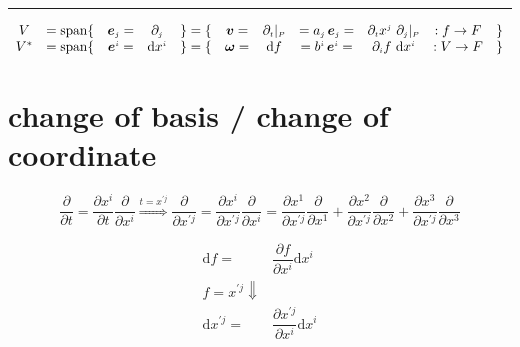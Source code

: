 \documentclass[
]{book}
\theoremstyle{definition}
\theoremstyle{definition}
\theoremstyle{definition}
\theoremstyle{definition}
\theoremstyle{remark}
\begin{document}
\begin{center}\rule{0.5\linewidth}{0.5pt}\end{center}

\[
\begin{array}{ccccccccccc}
V & =\mathrm{span}\{ & \boldsymbol{e}_{{\scriptscriptstyle j}}= & \partial_{{\scriptscriptstyle j}} & \}=\{ & \boldsymbol{v}= & \partial_{{\scriptscriptstyle t}}|_{{\scriptscriptstyle P}} & =a_{{\scriptscriptstyle j}}\thinspace\boldsymbol{e}_{{\scriptscriptstyle j}}= & \partial_{{\scriptscriptstyle t}}x^{{\scriptscriptstyle j}}\ \partial_{{\scriptscriptstyle j}}|_{{\scriptscriptstyle P}} & :f\rightarrow F & \}\\
V^{*} & =\mathrm{span}\{ & \boldsymbol{e}^{{\scriptscriptstyle i}}= & \mathrm{d}x^{{\scriptscriptstyle i}} & \}=\{ & \boldsymbol{\omega}= & \mathrm{d}f & =b^{{\scriptscriptstyle i}}\thinspace\boldsymbol{e}^{{\scriptscriptstyle i}}= & \partial_{{\scriptscriptstyle i}}f\ \mathrm{d}x^{{\scriptscriptstyle i}} & :V\rightarrow F & \}
\end{array}
\]

\section{change of basis / change of coordinate}\label{change-of-basis-change-of-coordinate}

\[
\dfrac{\partial}{\partial t}=\dfrac{\partial x^{{\scriptscriptstyle i}}}{\partial t}\dfrac{\partial}{\partial x^{{\scriptscriptstyle i}}}\overset{t=x^{\prime{\scriptscriptstyle j}}}{\Rightarrow}\dfrac{\partial}{\partial x^{\prime{\scriptscriptstyle j}}}=\dfrac{\partial x^{{\scriptscriptstyle i}}}{\partial x^{\prime{\scriptscriptstyle j}}}\dfrac{\partial}{\partial x^{{\scriptscriptstyle i}}}=\dfrac{\partial x^{{\scriptscriptstyle 1}}}{\partial x^{\prime{\scriptscriptstyle j}}}\dfrac{\partial}{\partial x^{{\scriptscriptstyle 1}}}+\dfrac{\partial x^{{\scriptscriptstyle 2}}}{\partial x^{\prime{\scriptscriptstyle j}}}\dfrac{\partial}{\partial x^{{\scriptscriptstyle 2}}}+\dfrac{\partial x^{{\scriptscriptstyle 3}}}{\partial x^{\prime{\scriptscriptstyle j}}}\dfrac{\partial}{\partial x^{{\scriptscriptstyle 3}}}
\]

\[
\begin{aligned}
\mathrm{d}f= & \dfrac{\partial f}{\partial x^{{\scriptscriptstyle i}}}\mathrm{d}x^{{\scriptscriptstyle i}}\\
f=x^{\prime{\scriptscriptstyle j}}\Downarrow\\
\mathrm{d}x^{\prime{\scriptscriptstyle j}}= & \dfrac{\partial x^{\prime{\scriptscriptstyle j}}}{\partial x^{{\scriptscriptstyle i}}}\mathrm{d}x^{{\scriptscriptstyle i}}
\end{aligned}
\]
\end{document}
